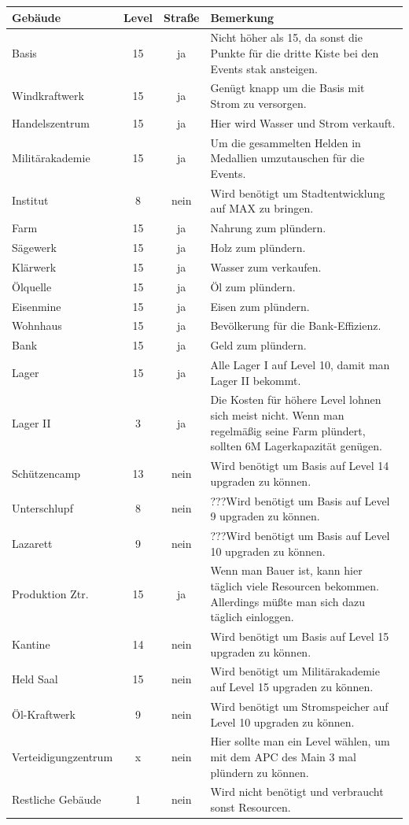 \documentclass[fontsize=12pt,a4paper,draft]{scrartcl}[2003/01/01]
\begin{document}
\begin{tabularx}{0.9\textwidth}{lccX}
  Gebäude & Level & Straße & Bemerkung \\
  \hline
  Basis & 15 & ja & Nicht höher als 15, da sonst die Punkte für die dritte Kiste bei den Events stak ansteigen. \\
  Windkraftwerk & 15 & ja & Genügt knapp um die Basis mit Strom zu versorgen. \\
  Handelszentrum & 15 & ja & Hier wird Wasser und Strom verkauft. \\
  Militärakademie & 15 & ja & Um die gesammelten Helden in Medallien umzutauschen für die Events. \\
  Institut & 8 & nein & Wird benötigt um Stadtentwicklung auf MAX zu bringen. \\
  Farm & 15 & ja & Nahrung zum plündern. \\
  Sägewerk & 15 & ja & Holz zum plündern. \\
  Klärwerk & 15 & ja & Wasser zum verkaufen. \\
  Ölquelle & 15 & ja & Öl zum plündern. \\
  Eisenmine & 15 & ja & Eisen zum plündern. \\
  Wohnhaus & 15 & ja & Bevölkerung für die Bank-Effizienz. \\
  Bank & 15 & ja & Geld zum plündern. \\
  Lager & 15 & ja & Alle Lager I auf Level 10, damit man Lager II bekommt. \\
  Lager II & 3 & ja & Die Kosten für höhere Level lohnen sich meist nicht. Wenn man regelmäßig seine Farm plündert, sollten 6M Lagerkapazität genügen. \\
  Schützencamp & 13 & nein & Wird benötigt um Basis auf Level 14 upgraden zu können. \\
  Unterschlupf & 8 & nein & ???Wird benötigt um Basis auf Level 9 upgraden zu können. \\
  Lazarett & 9 & nein & ???Wird benötigt um Basis auf Level 10 upgraden zu können. \\
  Produktion Ztr. & 15 & ja & Wenn man Bauer ist, kann hier täglich viele Resourcen bekommen. Allerdings müßte man sich dazu täglich einloggen.\\
  Kantine & 14 & nein & Wird benötigt um Basis auf Level 15 upgraden zu können. \\
  Held Saal & 15 & nein & Wird benötigt um Militärakademie auf Level 15 upgraden zu können. \\
  Öl-Kraftwerk & 9 & nein & Wird benötigt um Stromspeicher auf Level 10 upgraden zu können. \\
  Verteidigungzentrum & x & nein & Hier sollte man ein Level wählen, um mit dem APC des Main 3 mal plündern zu können. \\
  Restliche Gebäude & 1 & nein & Wird nicht benötigt und verbraucht sonst Resourcen. \\
\end{tabularx}
\end{document}
